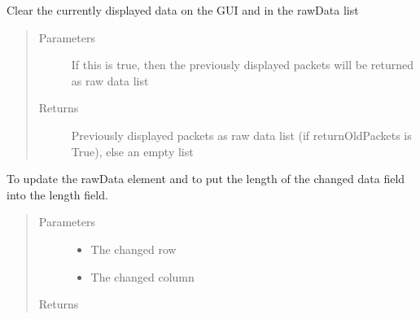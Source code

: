 \documentclass[letterpaper,10pt,english]{sphinxmanual}
\begin{document}
\begin{fulllineitems}
\begin{fulllineitems}
\end{fulllineitems}


\begin{fulllineitems}
\label{\detokenize{src:src.AbstractTab.AbstractTab.clear}}
Clear the currently displayed data on the GUI and in the rawData list
\begin{quote}\begin{description}
\item[{Parameters}] \leavevmode
{} \textendash{} If this is true, then the previously displayed packets will
be returned as raw data list

\item[{Returns}] \leavevmode
Previously displayed packets as raw data list (if returnOldPackets is True), else an empty list

\end{description}\end{quote}

\end{fulllineitems}


\begin{fulllineitems}
\label{\detokenize{src:src.AbstractTab.AbstractTab.handleCellChanged}}
To update the rawData element and
to put the length of the changed data field into the length field.
\begin{quote}\begin{description}
\item[{Parameters}] \leavevmode\begin{itemize}
\item {} 
 \textendash{} The changed row

\item {} 
 \textendash{} The changed column

\end{itemize}

\item[{Returns}] \leavevmode


\end{description}\end{quote}


\end{fulllineitems}
\end{fulllineitems}
\end{document}
